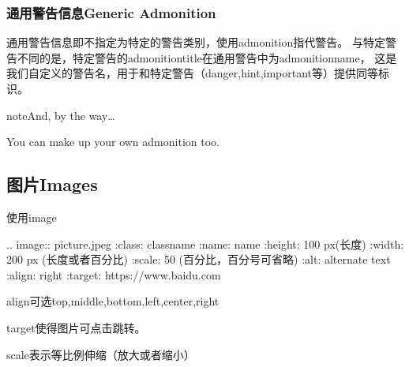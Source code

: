 \documentclass[a4paper,10pt,english]{sphinxmanual}
\begin{document}
\subsubsection{通用警告信息Generic Admonition}
\label{\detokenize{reStructureText_syntax:generic-admonition}}
\sphinxAtStartPar
通用警告信息即不指定为特定的警告类别，使用admonition指代警告。
与特定警告不同的是，特定警告的admonition\sphinxhyphen{}title在通用警告中为admonition\sphinxhyphen{}name，
这是我们自定义的警告名，用于和特定警告（danger,hint,important等）提供同等标识。

\sphinxAtStartPar
{}

\begin{sphinxVerbatim}[commandchars=\\\{\}]
     

          
\end{sphinxVerbatim}

\sphinxAtStartPar
{}

\begin{sphinxadmonition}{note}{And, by the way…}

\sphinxAtStartPar
You can make up your own admonition too.
\end{sphinxadmonition}


\subsection{图片Images}
\label{\detokenize{reStructureText_syntax:images}}
\sphinxAtStartPar
使用image

\begin{sphinxVerbatim}[commandchars=\\\{\}]
.. image:: picture.jpeg
   :class: class\PYGZhy{}name
       :name: name
   :height: 100 px(长度)
   :width: 200 px (长度或者百分比)
   :scale: 50 \PYGZpc{} (百分比，百分号可省略)
   :alt: alternate text
   :align: right
       :target: https://www.baidu.com
\end{sphinxVerbatim}

\sphinxAtStartPar
align可选top,middle,bottom,left,center,right

\sphinxAtStartPar
target使得图片可点击跳转。

\sphinxAtStartPar
scale表示等比例伸缩（放大或者缩小）
\end{document}
